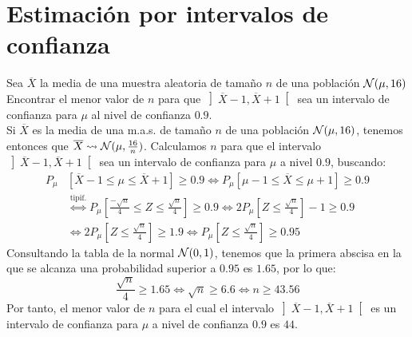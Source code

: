 \section{Estimación por intervalos de confianza}

\begin{ejercicio}
    Sea $\overline{X}$ la media de una muestra aleatoria de tamaño $n$ de una población $\mathcal{N}(\mu, 16)$ Encontrar el menor valor de $n$ para que $\left]\overline{X}-1,\overline{X}+1\right[$ sea un intervalo de confianza para $\mu$ al nivel de confianza $0.9$.\\

    \noindent
    Si $\overline{X}$ es la media de una m.a.s. de tamaño $n$ de una población $\mathcal{N}(\mu,16)$, tenemos entonces que $\overline{X}\rightsquigarrow\mathcal{N}(\mu, \frac{16}{n})$. Calculamos $n$ para que el intervalo $\left]\overline{X}-1,\overline{X}+1\right[$ sea un intervalo de confianza para $\mu$ a nivel $0.9$, buscando:
    \begin{align*}
        P_\mu&\left[\overline{X}-1 \leq \mu \leq \overline{X}+1\right] \geq 0.9 \Longleftrightarrow P_\mu[\mu-1\leq \overline{X}\leq \mu+1] \geq 0.9 \\
        &\stackrel{\text{tipif.}}{\Longleftrightarrow} P_\mu\left[\frac{-\sqrt{n}}{4} \leq Z \leq \frac{\sqrt{n}}{4}\right] \geq 0.9 
        \Longleftrightarrow 2P_\mu\left[Z\leq \frac{\sqrt{n}}{4}\right] - 1 \geq 0.9 \\
        &\Longleftrightarrow 2P_\mu\left[Z\leq \frac{\sqrt{n}}{4}\right] \geq 1.9 
        \Longleftrightarrow P_\mu\left[Z\leq \frac{\sqrt{n}}{4}\right] \geq 0.95 
    \end{align*}
    Consultando la tabla de la normal $\mathcal{N}(0,1)$, tenemos que la primera abscisa en la que se alcanza una probabilidad superior a $0.95$ es $1.65$, por lo que:
    \begin{equation*}
        \frac{\sqrt{n}}{4} \geq 1.65 \Longleftrightarrow \sqrt{n} \geq 6.6 \Longleftrightarrow n \geq 43.56
    \end{equation*}
    Por tanto, el menor valor de $n$ para el cual el intervalo $\left]\overline{X}-1,\overline{X}+1\right[$ es un intervalo de confianza para $\mu$ a nivel de confianza $0.9$ es $44$.
\end{ejercicio}


